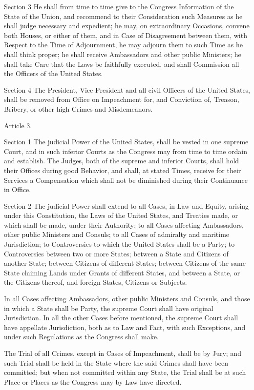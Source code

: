 \documentclass{article}
\begin{document}
Section 3
He shall from time to time give to the Congress Information of the State of the
Union, and recommend to their Consideration such Measures as he shall judge
necessary and expedient; he may, on extraordinary Occasions, convene both
Houses, or either of them, and in Case of Disagreement between them, with
Respect to the Time of Adjournment, he may adjourn them to such Time as he
shall think proper; he shall receive Ambassadors and other public Ministers; he
shall take Care that the Laws be faithfully executed, and shall Commission all
the Officers of the United States.

Section 4
The President, Vice President and all civil Officers of the United States,
shall be removed from Office on Impeachment for, and Conviction of, Treason,
Bribery, or other high Crimes and Misdemeanors.

Article 3.

Section 1
The judicial Power of the United States, shall be vested in one supreme Court,
and in such inferior Courts as the Congress may from time to time ordain and
establish. The Judges, both of the supreme and inferior Courts, shall hold
their Offices during good Behavior, and shall, at stated Times, receive for
their Services a Compensation which shall not be diminished during their
Continuance in Office.

Section 2
The judicial Power shall extend to all Cases, in Law and Equity, arising under
this Constitution, the Laws of the United States, and Treaties made, or which
shall be made, under their Authority; to all Cases affecting Ambassadors, other
public Ministers and Consuls; to all Cases of admiralty and maritime
Jurisdiction; to Controversies to which the United States shall be a Party; to
Controversies between two or more States; between a State and Citizens of
another State; between Citizens of different States; between Citizens of the
same State claiming Lands under Grants of different States, and between a
State, or the Citizens thereof, and foreign States, Citizens or Subjects.

In all Cases affecting Ambassadors, other public Ministers and Consuls, and
those in which a State shall be Party, the supreme Court shall have original
Jurisdiction. In all the other Cases before mentioned, the supreme Court shall
have appellate Jurisdiction, both as to Law and Fact, with such Exceptions, and
under such Regulations as the Congress shall make.

The Trial of all Crimes, except in Cases of Impeachment, shall be by Jury; and
such Trial shall be held in the State where the said Crimes shall have been
committed; but when not committed within any State, the Trial shall be at such
Place or Places as the Congress may by Law have directed.
\end{document}

